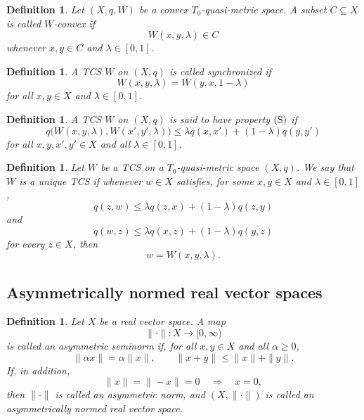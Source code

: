 \documentclass[preprint,12pt]{elsarticle}
\numberwithin{equation}{section}
\newtheorem{definition}[theorem]{Definition}
\begin{document}
\begin{definition}\label{def:Wconvexset}
Let \((X,q,W)\) be a convex \(T_{0}\)-quasi-metric space.  A subset
\(C\subseteq X\) is called \emph{\(W\)-convex} if
\[
W(x,y,\lambda)\in C
\]
whenever \(x,y\in C\) and \(\lambda\in[0,1]\).
\end{definition}

\begin{definition}\label{def:synchronized}
A TCS \(W\) on \((X,q)\) is called \emph{synchronized} if
\[
W(x,y,\lambda)=W(y,x,1-\lambda)
\]
for all \(x,y\in X\) and \(\lambda\in[0,1]\).
\end{definition}

\begin{definition}\label{def:propertyS}
A TCS \(W\) on \((X,q)\) is said to have \emph{property \({\rm(S)}\)} if
\[
q\bigl(W(x,y,\lambda),W(x',y',\lambda)\bigr)
\le
\lambda q(x,x')+(1-\lambda)q(y,y')
\]
for all \(x,y,x',y'\in X\) and all \(\lambda\in[0,1]\).
\end{definition}

\begin{definition}\label{def:uniqueTCS}
Let \(W\) be a TCS on a \(T_{0}\)-quasi-metric space \((X,q)\).  We say that
\(W\) is a \emph{unique TCS} if whenever \(w\in X\) satisfies, for some
\(x,y\in X\) and \(\lambda\in[0,1]\),
\[
q(z,w)\le \lambda q(z,x)+(1-\lambda)q(z,y)
\]
and
\[
q(w,z)\le \lambda q(x,z)+(1-\lambda)q(y,z)
\]
for every \(z\in X\), then
\[
w=W(x,y,\lambda).
\]
\end{definition}

\subsection{Asymmetrically normed real vector spaces}
\label{subsec:asynorm}

\begin{definition}\label{def:asynorm}
Let \(X\) be a real vector space.  A map
\[
\|\cdot\|:X\longrightarrow [0,\infty)
\]
is called an \emph{asymmetric seminorm} if, for all \(x,y\in X\) and all
\(\alpha\ge 0\),
\[
\|\alpha x\|=\alpha\|x\|,
\qquad
\|x+y\|\le \|x\|+\|y\|.
\]
If, in addition,
\[
\|x\|=\|-x\|=0\quad\Longrightarrow\quad x=0,
\]
then \(\|\cdot\|\) is called an \emph{asymmetric norm}, and
\((X,\|\cdot\|)\) is called an \emph{asymmetrically normed real vector space}.
\end{definition}
\end{document}

